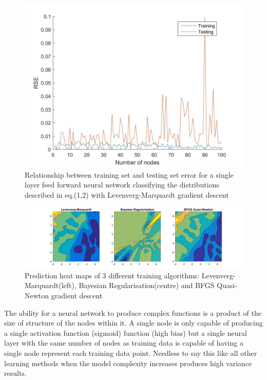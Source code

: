 \documentclass[a4paper,10pt, twocolumn]{article}
\begin{document}
\begin{figure}[ht]
	\includegraphics[width=0.9\linewidth]{nnErrorVar.jpg}
	\centering
	\caption{Relationship between training set and testing set error for a single layer feed forward neural network classifying the distributions described in eq.(1,2) with Levenverg-Marquardt gradient descent }
		\label{fig:NNnodes}
\end{figure}

\begin{figure}[ht]
	\includegraphics[width=0.9\linewidth]{nnAlg.jpg}
	\centering
	\caption{Prediction heat maps of 3 different training algorithms: Levenverg-Marquardt(left), Bayesian Regularisation(centre) and BFGS Quasi-Newton gradient descent}
		\label{fig:NNalg}
\end{figure}

The ability for a neural network to produce complex functions is a product of the size of structure of the nodes within it. A single node is only capable of producing a single activation function (sigmoid) function (high bias) but a single neural layer with the same number of nodes as training data is capable of having a single node represent each training data point. Needless to say this like all other learning methods when the model complexity increases produces high variance results.
\end{document}
